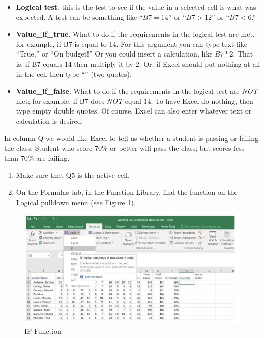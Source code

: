 \begin{itemize}
	\item \textbf{Logical test}. this is the test to see if the value in a selected cell is what was expected. A test can be something like ``$ B7=14 $'' or ``$ B7>12 $'' or ``$ B7<6 $.''
	\item \textbf{Value\_if\_true}. What to do if the requirements in the logical test are met, for example, if \textsf{B7} is equal to $ 14 $. For this argument you can type text like ``True,'' or ``On budget!'' Or you could insert a calculation, like $ B7*2 $. That is, if \textsf{B7} equals $ 14 $ then multiply it by $ 2 $. Or, if Excel should put nothing at all in the cell then type ``'' (two quotes).
	\item \textbf{Value\_if\_false}. What to do if the requirements in the logical test are \textit{NOT} met; for example, if \textsf{B7} does \textit{NOT} equal $ 14 $. To have Excel do nothing, then type empty double quotes. Of course, Excel can also enter whatever text or calculation is desired.
\end{itemize}

In column Q we would like Excel to tell us whether a student is passing or failing the class. Student who score $ 70\% $ or better will pass the class; but scores less than $ 70\% $ are failing.

\begin{enumerate}
	\item Make sure that \textsf{Q5} is the active cell.
	\item On the Formulas tab, in the Function Library, find the  function on the Logical pulldown menu (see Figure \ref{03:fig09}).
\end{enumerate}

\begin{figure}[H]
	\centering
	\includegraphics[width=\maxwidth{.95\linewidth}]{gfx/ch03_fig09}
	\caption{IF Function}
	\label{03:fig09}
\end{figure}

